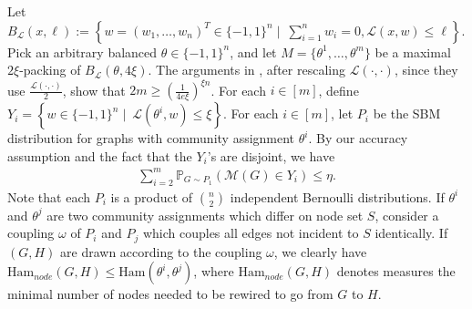 \documentclass{article}
\begin{document}
Let $B_{\mathcal{L}}(x, \ell) := \left\{w = (w_1, \dots, w_n)^T \in \{-1, 1\}^n \mid \ \sum_{i = 1}^nw_i = 0, \mathcal{L}(x, w) \leq \ell\right\}$. Pick an arbitrary balanced $\theta \in \{-1, 1\}^n$, and let $M = \{\theta^1, \dots, \theta^m\}$ be a maximal $2\xi$-packing of $B_{\mathcal{L}}(\theta, 4\xi)$. The arguments in \cite{CheEtal23}, after rescaling $\mathcal{L}(\cdot, \cdot)$, since they use $\frac{\mathcal{L}(\cdot, \cdot)}{2}$, show that $2m \geq \left(\frac{1}{4e\xi}\right)^{\xi n}$. For each $i \in [m]$, define $Y_i = \left\{w \in \{-1, 1\}^n \mid \ \mathcal{L}(\theta^i, w) \leq \xi\right\}$. For each $i \in [m]$, let $P_i$ be the SBM distribution for graphs with community assignment $\theta^i$. By our accuracy assumption and the fact that the $Y_i$'s are disjoint, we have
\begin{align}
\label{eq:add_Y_i_approx}
\sum_{i = 2}^m\mathbb{P}_{G \sim P_1}(\mathcal{M}(G) \in Y_i) \leq \eta.
\end{align}
Note that each $P_i$ is a product of $\binom{n}{2}$ independent Bernoulli distributions. If $\theta^i$ and $\theta^j$ are two community assignments which differ on node set $S$, consider a coupling $\omega$ of $P_i$ and $P_j$ which couples all edges not incident to $S$ identically.
If $(G,H)$ are drawn according to the coupling $\omega$, we clearly have $\mathrm{Ham}_{node}(G, H) \leq \mathrm{Ham}(\theta^i, \theta^j)$, where $\mathrm{Ham}_{node}(G, H)$ denotes measures the minimal number of nodes needed to be rewired to go from $G$ to $H$.
\end{document}
